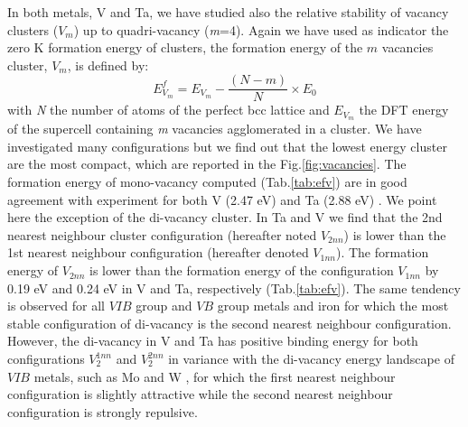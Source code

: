 \documentclass[a4,12pt,showpacs,preprintnumbers,amsmath,amssymb]{revtex4}
\begin{document}
In both metals, V and Ta, we have studied also the relative stability of vacancy 
clusters ($V_m$)  up to quadri-vacancy (\textit{m}=4). Again we have used as indicator the zero K formation energy of clusters, the formation energy of 
the $m$ vacancies cluster, $V_m$, is defined by:
\begin{equation}
 E^f_{V_m} = E_{V_m} - \frac{(N-m)}{N} \times E_0
\end{equation}
with  \textit{N} the number of atoms of the perfect bcc lattice and $E_{V_m}$ the DFT energy of the 
supercell containing \textit{m} vacancies agglomerated in a cluster. 
% 
We have investigated many configurations but we find out that the lowest energy cluster are the most compact, 
which are reported in the Fig.\ref{fig:vacancies}.  
The formation energy of mono-vacancy computed (Tab.\ref{tab:efv}) are in good agreement with experiment 
for both V (2.47 eV) \cite{maier1979,janot1982} and Ta (2.88 eV) \cite{maier1979,schultz1982,Schaefer1987}.
We point here the exception of the di-vacancy cluster. 
In Ta and V we find that the 2nd nearest neighbour cluster configuration (hereafter noted $V_{2nn}$) is lower than 
the 1st nearest neighbour configuration (hereafter denoted $V_{1nn}$). The formation energy of $V_{2nn}$ is lower 
than the formation energy of the configuration $V_{1nn}$ by 0.19 eV and 0.24 eV in V and Ta, 
respectively (Tab.\ref{tab:efv}).
The same tendency is observed for all $VIB$ group and $VB$ group metals and iron for which the most stable configuration 
of di-vacancy is the second nearest neighbour configuration.
%
However, the di-vacancy in V and Ta has positive binding energy for both configurations
$V_2^{1nn}$ and  $V_2^{2nn}$ in variance with the di-vacancy energy landscape of $VIB$ metals, such as Mo and W 
\cite{Becquart200723,derlet2007,Huang2016121,muzyk2011,ODA2014,Ventelon201216}, 
for which the first nearest neighbour configuration is slightly attractive while the second nearest neighbour 
configuration is strongly repulsive.     
 
\end{document}

